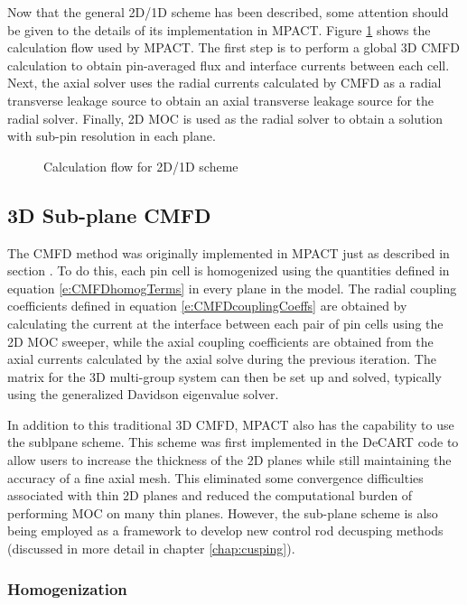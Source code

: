 Now that the general 2D/1D scheme has been described, some attention should be given to the details of its implementation in MPACT.  Figure \ref{f:2d1d-flowchart} shows the calculation flow used by MPACT.  The first step is to perform a global 3D CMFD calculation to obtain pin-averaged flux and interface currents between each cell.  Next, the axial solver uses the radial currents calculated by CMFD as a radial transverse leakage source to obtain an axial transverse leakage source for the radial solver.  Finally, 2D MOC is used as the radial solver to obtain a solution with sub-pin resolution in each plane.

\begin{figure}
\centering

\caption{Calculation flow for 2D/1D scheme}\label{f:2d1d-flowchart}
\end{figure}

\subsection{3D Sub-plane CMFD}

The CMFD method was originally implemented in MPACT just as described in section .  To do this, each pin cell is homogenized using the quantities defined in equation \ref{e:CMFDhomogTerms} in every plane in the model.  The radial coupling coefficients defined in equation \ref{e:CMFDcouplingCoeffs} are obtained by calculating the current at the interface between each pair of pin cells using the 2D MOC sweeper, while the axial coupling coefficients are obtained from the axial currents calculated by the axial solve during the previous iteration.  The matrix for the 3D multi-group system can then be set up and solved, typically using the generalized Davidson eigenvalue solver.

In addition to this traditional 3D CMFD, MPACT also has the capability to use the sublpane scheme.  This scheme was first implemented in the DeCART code to allow users to increase the thickness of the 2D planes while still maintaining the accuracy of a fine axial mesh.  This eliminated some convergence difficulties associated with thin 2D planes  and reduced the computational burden of performing MOC on many thin planes.  However, the sub-plane scheme is also being employed as a framework to develop new control rod decusping methods (discussed in more detail in chapter \ref{chap:cusping}).


\subsubsection{Homogenization}

